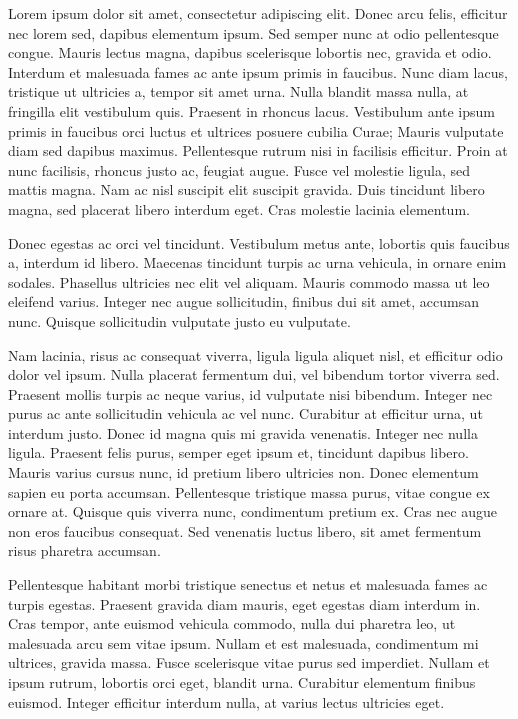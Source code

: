 Lorem ipsum dolor sit amet, consectetur adipiscing elit. Donec arcu felis, efficitur nec lorem sed, dapibus elementum ipsum. Sed semper nunc at odio pellentesque congue. Mauris lectus magna, dapibus scelerisque lobortis nec, gravida et odio. Interdum et malesuada fames ac ante ipsum primis in faucibus. Nunc diam lacus, tristique ut ultricies a, tempor sit amet urna. Nulla blandit massa nulla, at fringilla elit vestibulum quis. Praesent in rhoncus lacus. Vestibulum ante ipsum primis in faucibus orci luctus et ultrices posuere cubilia Curae; Mauris vulputate diam sed dapibus maximus. Pellentesque rutrum nisi in facilisis efficitur. Proin at nunc facilisis, rhoncus justo ac, feugiat augue. Fusce vel molestie ligula, sed mattis magna. Nam ac nisl suscipit elit suscipit gravida. Duis tincidunt libero magna, sed placerat libero interdum eget. Cras molestie lacinia elementum.

Donec egestas ac orci vel tincidunt. Vestibulum metus ante, lobortis quis faucibus a, interdum id libero. Maecenas tincidunt turpis ac urna vehicula, in ornare enim sodales. Phasellus ultricies nec elit vel aliquam. Mauris commodo massa ut leo eleifend varius. Integer nec augue sollicitudin, finibus dui sit amet, accumsan nunc. Quisque sollicitudin vulputate justo eu vulputate.

Nam lacinia, risus ac consequat viverra, ligula ligula aliquet nisl, et efficitur odio dolor vel ipsum. Nulla placerat fermentum dui, vel bibendum tortor viverra sed. Praesent mollis turpis ac neque varius, id vulputate nisi bibendum. Integer nec purus ac ante sollicitudin vehicula ac vel nunc. Curabitur at efficitur urna, ut interdum justo. Donec id magna quis mi gravida venenatis. Integer nec nulla ligula. Praesent felis purus, semper eget ipsum et, tincidunt dapibus libero. Mauris varius cursus nunc, id pretium libero ultricies non. Donec elementum sapien eu porta accumsan. Pellentesque tristique massa purus, vitae congue ex ornare at. Quisque quis viverra nunc, condimentum pretium ex. Cras nec augue non eros faucibus consequat. Sed venenatis luctus libero, sit amet fermentum risus pharetra accumsan.

Pellentesque habitant morbi tristique senectus et netus et malesuada fames ac turpis egestas. Praesent gravida diam mauris, eget egestas diam interdum in. Cras tempor, ante euismod vehicula commodo, nulla dui pharetra leo, ut malesuada arcu sem vitae ipsum. Nullam et est malesuada, condimentum mi ultrices, gravida massa. Fusce scelerisque vitae purus sed imperdiet. Nullam et ipsum rutrum, lobortis orci eget, blandit urna. Curabitur elementum finibus euismod. Integer efficitur interdum nulla, at varius lectus ultricies eget.

